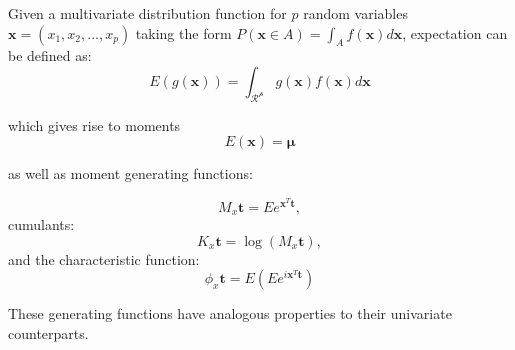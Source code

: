\begin{definition}
\label{def:mvexpectation}

Given a multivariate distribution function for $p$ random variables $\boldsymbol{x} = (x_{1}, x_{2}, \ldots, x_{p})$ taking the form $P(\boldsymbol{x}\in A) = \int_{A} f(\boldsymbol{x})d\boldsymbol{x}$, expectation can be defined as:
\begin{equation}
\label{eq:mvexp}
E(g(\boldsymbol{x})) = \int_{\mathscr{R^{p}}} g(\boldsymbol{x})f(\boldsymbol{x})d\boldsymbol{x}
\end{equation}

which gives rise to moments
\begin{equation}
E(\boldsymbol{x}) = \boldsymbol{\mu}
\end{equation}

as well as moment generating functions:

\begin{equation}
M_{x}\boldsymbol{t} = E e^{\boldsymbol{x}^{T}\boldsymbol{t}},
\end{equation}
cumulants:
\begin{equation}
K_{x}\boldsymbol{t} = \log( M_{x}\boldsymbol{t}), 
\end{equation}
and the characteristic function:
\begin{equation}
\phi_{x}\boldsymbol{t} = E( E e^{i\boldsymbol{x}^{T}\boldsymbol{t}})
\end{equation}

These generating functions have analogous properties to their univariate counterparts.

\end{definition}